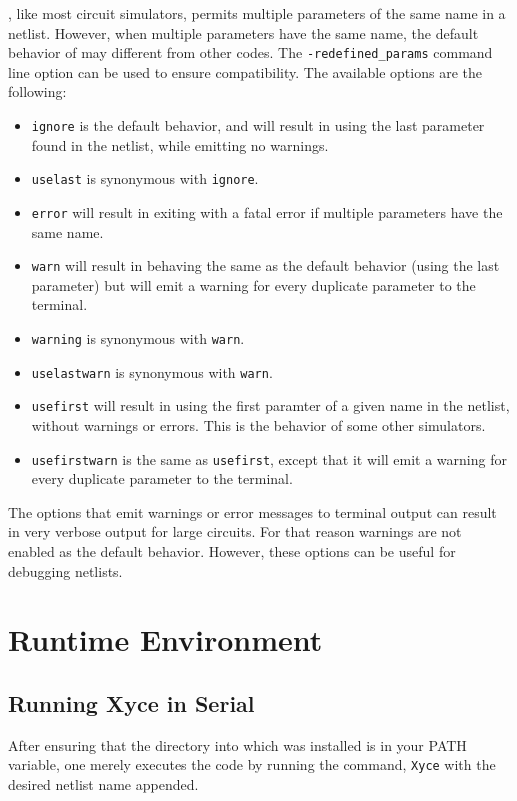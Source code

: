 \Xyce{}, like most circuit simulators, permits multiple parameters of the same name in a netlist.  
However, when multiple parameters have the same name, the default behavior of \Xyce{} may different from other codes.
The \texttt{-redefined\_params} command line option can be used to ensure compatibility.  The available options are the following:
\begin{itemize}
  \item \verb+ignore+ is the default behavior, and will result in \Xyce{} using the last parameter found in the netlist, while emitting no warnings.
  \item \verb+uselast+ is synonymous with \verb+ignore+.
  \item \verb+error+ will result in \Xyce{} exiting with a fatal error if multiple parameters have the same name.
  \item \verb+warn+ will result in \Xyce{} behaving the same as the default behavior (using the last parameter) but will emit a warning for every duplicate parameter to the terminal.
  \item \verb+warning+ is synonymous with \verb+warn+.
  \item \verb+uselastwarn+ is synonymous with \verb+warn+.
  \item \verb+usefirst+ will result in \Xyce{} using the first paramter of a given name in the netlist, without warnings or errors.  This is the behavior of some other simulators.
  \item \verb+usefirstwarn+ is the same as \verb+usefirst+, except that it will emit a warning for every duplicate parameter to the terminal.
\end{itemize}
The options that emit warnings or error messages to terminal output can result in very verbose output for large circuits.  
For that reason warnings are not enabled as the default behavior.  However, these options can be useful for debugging netlists.

\cleardoublepage

\chapter{Runtime Environment}
\label{runtime}

\section{Running Xyce in Serial}

After ensuring that the directory into which \Xyce{} was installed is
in your PATH variable, one merely executes the code by running the
command, \texttt{Xyce} with the desired netlist name appended.

